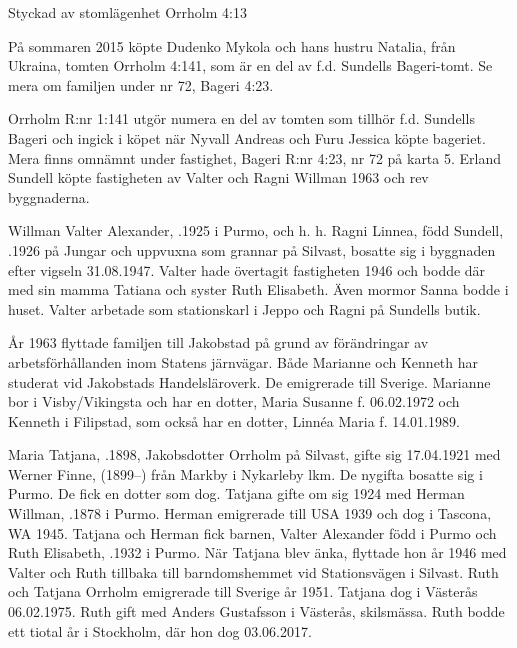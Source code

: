 %

Styckad av stomlägenhet Orrholm 4:13

%
På sommaren 2015 köpte Dudenko Mykola och hans hustru Natalia, från Ukraina, tomten Orrholm 4:141, som är en del av f.d. Sundells Bageri-tomt. Se mera om familjen under nr 72, Bageri 4:23.


%
Orrholm R:nr 1:141 utgör numera en del av tomten som tillhör  f.d. Sundells Bageri och ingick i köpet när  Nyvall Andreas och Furu Jessica köpte bageriet. Mera finns omnämnt under fastighet, Bageri R:nr 4:23, nr 72 på karta 5. Erland Sundell köpte fastigheten av Valter och Ragni Willman 1963 och rev byggnaderna.


%
Willman Valter Alexander, .1925  i Purmo, och h. h. Ragni Linnea, född Sundell, .1926 på Jungar och uppvuxna som grannar på Silvast, bosatte sig i byggnaden efter vigseln 31.08.1947. Valter hade övertagit fastigheten 1946 och bodde där med sin mamma Tatiana och syster Ruth Elisabeth. Även mormor Sanna bodde i huset. Valter arbetade som stationskarl i Jeppo och Ragni på Sundells butik.
\begin{jhchildren}
  \item {}
  \item {}
\end{jhchildren}
År 1963 flyttade familjen till Jakobstad på grund av förändringar av arbetsförhållanden inom Statens järnvägar. Både Marianne och Kenneth har studerat vid Jakobstads Handelsläroverk. De emigrerade till Sverige. Marianne bor i Visby/Vikingsta och har en dotter, Maria Susanne f. 06.02.1972 och Kenneth i Filipstad, som också har en dotter, Linnéa Maria f. 14.01.1989.

Maria Tatjana, .1898, Jakobsdotter Orrholm på Silvast, gifte sig 17.04.1921 med Werner Finne, (1899--) från Markby i Nykarleby lkm. De nygifta bosatte sig i Purmo. De fick en dotter som dog. Tatjana gifte om sig 1924 med Herman Willman, .1878 i Purmo. Herman emigrerade till USA 1939 och dog i Tascona, WA 1945. Tatjana och Herman fick barnen, Valter Alexander född i Purmo och Ruth Elisabeth, .1932 i Purmo. När Tatjana blev änka, flyttade hon år 1946 med Valter och Ruth tillbaka till barndomshemmet vid Stationsvägen i Silvast. Ruth och Tatjana Orrholm emigrerade till Sverige år 1951. Tatjana dog i Västerås 06.02.1975. Ruth gift med Anders Gustafsson i Västerås, skilsmässa. Ruth bodde ett tiotal år i Stockholm, där hon dog 03.06.2017.


